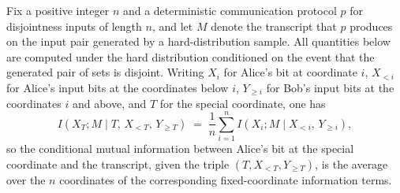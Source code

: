 \begin{theorem}
\label{CommunicationComplexity.Functions.Disjointness.RandomizedLowerBound.aliceInfoTerm_eq_average_fixedAliceInfoTerm}
\leanok
{}
Fix a positive integer $n$ and a deterministic communication protocol $p$ for
disjointness inputs of length $n$, and let $M$ denote the transcript that $p$ produces
on the input pair generated by a hard-distribution sample. All quantities below are
computed under the hard distribution conditioned on the event that the generated pair of
sets is disjoint. Writing $X_i$ for Alice's bit at coordinate $i$, $X_{<i}$ for Alice's
input bits at the coordinates below $i$, $Y_{\ge i}$ for Bob's input bits at the
coordinates $i$ and above, and $T$ for the special coordinate, one has
\[
I\!\left(X_T ; M \mid T,\, X_{<T},\, Y_{\ge T}\right)
  \;=\; \frac{1}{n} \sum_{i=1}^{n} I\!\left(X_i ; M \mid X_{<i},\, Y_{\ge i}\right),
\]
so the conditional mutual information between Alice's bit at the special coordinate and
the transcript, given the triple $(T, X_{<T}, Y_{\ge T})$, is the average over the $n$
coordinates of the corresponding fixed-coordinate information terms.
\end{theorem}


